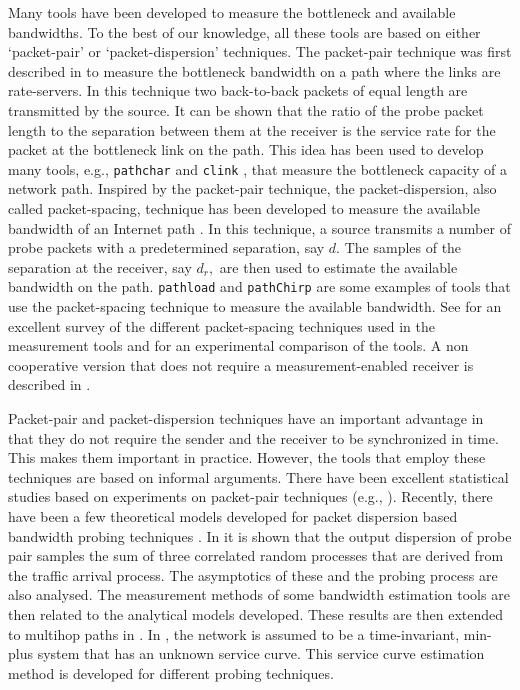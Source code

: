 \documentclass[11pt]{article}
\begin{document}
Many tools have been developed to measure the bottleneck and available
bandwidths. To the best of our knowledge, all these tools are based on
either `packet-pair' or `packet-dispersion' techniques.  The
packet-pair technique was first described in \cite{Keshav91} to
measure the bottleneck bandwidth on a path where the links are
rate-servers. In this technique two back-to-back packets of equal
length are transmitted by the source.  It can be shown that the ratio
of the probe packet length to the separation between them at the
receiver is the service rate for the packet at the bottleneck link on
the path.  This idea has been used to develop many tools, e.g.,
\texttt{pathchar} \cite{Jacobson97} and \texttt{clink}
\cite{Downey99}, that measure the bottleneck capacity of a network
path. Inspired by the packet-pair technique, the packet-dispersion,
also called packet-spacing, technique has been developed to measure
the available bandwidth of an Internet path
\cite{Jain02,Rebeiro03,Prasad03,Strauss03,Chakraborty05}. In this
technique, a source transmits a number of probe packets with a
predetermined separation, say $d.$ The samples of the separation at
the receiver, say $d_r,$ are then used to estimate the available
bandwidth on the path.  \texttt{pathload} \cite{Jain02} and
\texttt{pathChirp} \cite{Rebeiro03} are some examples of tools that
use the packet-spacing technique to measure the available bandwidth.
See \cite{Prasad03} for an excellent survey of the different
packet-spacing techniques used in the measurement tools and
\cite{Strauss03} for an experimental comparison of the tools. A non
cooperative version that does not require a measurement-enabled
receiver is described in \cite{Chakraborty05}.

Packet-pair and packet-dispersion techniques have an important
advantage in that they do not require the sender and the receiver to
be synchronized in time. This makes them important in practice.
However, the tools that employ these techniques are based on informal
arguments. There have been excellent statistical studies based on
experiments on packet-pair techniques (e.g.,
\cite{Dovrolis01,Pasztor03}). Recently, there have been a few
theoretical models developed for packet dispersion based bandwidth
probing techniques
\cite{Liu05,Liu07,Liu08,Liebeherr07,Park06,Haga06,Machiraju07}. In
\cite{Liu05,Liu07} it is shown that the output dispersion of probe
pair samples the sum of three correlated random processes that are
derived from the traffic arrival process. The asymptotics of these and
the probing process are also analysed. The measurement methods of some
bandwidth estimation tools are then related to the analytical models
developed. These results are then extended to multihop paths in
\cite{Liu08}. In \cite{Liebeherr07}, the network is assumed to be a
time-invariant, min-plus system that has an unknown service
curve. This service curve estimation method is developed for different
probing techniques. 
\end{document}
